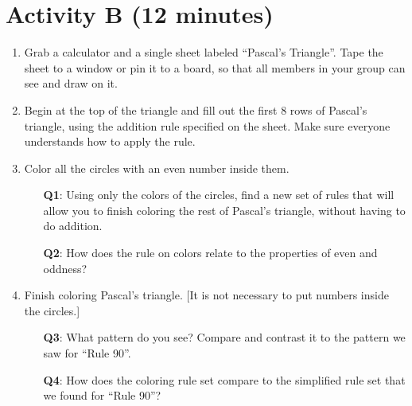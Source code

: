 \documentclass{article}
\begin{document}
\section*{Activity B (12 minutes)}

\begin{enumerate}
	\item Grab a calculator and a single sheet labeled ``Pascal's Triangle''.
	Tape the sheet to a window or pin it to a board, so that all members in your
	group can see and draw on it.

	\item Begin at the top of the triangle and fill out the first 8 rows of
	Pascal's triangle, using the addition rule specified on the sheet. Make sure
	everyone understands how to apply the rule.

	\item Color all the circles with an even number inside them.

	\begin{itemize}
		\item[\textbf{Q1}:] Using only the colors of the circles, find a
		new set of rules that will allow you to finish coloring the rest of
		Pascal's triangle, without having to do addition.

		\item [\textbf{Q2}:] How does the rule on colors relate to the properties
		of even and oddness?

	\end{itemize}

	\item Finish coloring Pascal's triangle. [It is not necessary to put numbers
	inside the circles.]

	\begin{itemize}

		\item[\textbf{Q3}:] What pattern do you see? Compare and contrast it
		to the pattern we saw for ``Rule 90''.


		\item[\textbf{Q4}:] How does the coloring rule set compare to the simplified
		rule set that we found for ``Rule 90''?

	\end{itemize}


\end{enumerate}

\newpage
\end{document}
